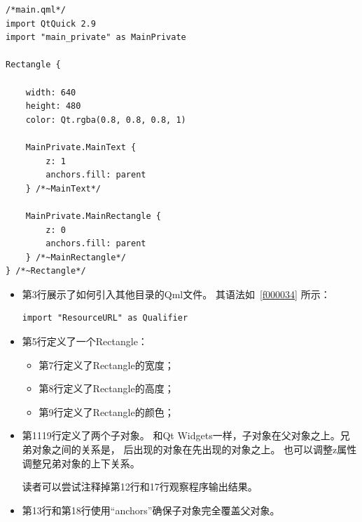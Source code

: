 \FloatBarrier
\begin{lstlisting}[label=f000031,
caption=GoodLuck,
title=\lstlistingname\ \thelstlisting\marginnote{\fbox{\footnotesize{\lstlistingname\ \thelstlisting}}}
]
/*main.qml*/
import QtQuick 2.9
import "main_private" as MainPrivate

Rectangle {

    width: 640
    height: 480
    color: Qt.rgba(0.8, 0.8, 0.8, 1)

    MainPrivate.MainText {
        z: 1
        anchors.fill: parent
    } /*~MainText*/

    MainPrivate.MainRectangle {
        z: 0
        anchors.fill: parent
    } /*~MainRectangle*/
} /*~Rectangle*/
\end{lstlisting}          %

\begin{itemize}

\item 第3行展示了如何引入其他目录的Qml文件。
其语法如\lstlistingname\ \ref{f000034}
所示：

\FloatBarrier
\begin{lstlisting}[label=f000034,
caption=GoodLuck,
title=\lstlistingname\ \thelstlisting\marginnote{\fbox{\footnotesize{\lstlistingname\ \thelstlisting}}}
]
import "ResourceURL" as Qualifier
\end{lstlisting}          %

\item 第5行定义了一个Rectangle：


\begin{itemize}
\item 第7行定义了Rectangle的宽度；
\item 第8行定义了Rectangle的高度；
\item 第9行定义了Rectangle的颜色；
\end{itemize}

\item 第11\raisebox{0.16ex}{\sourcefonttwo\~{}}19行定义了两个子对象。
和Qt Widgets一样，子对象在父对象之上。兄弟对象之间的关系是，
后出现的对象在先出现的对象之上。
也可以调整z属性调整兄弟对象的上下关系。

读者可以尝试注释掉第12行和17行观察程序输出结果。


\item 第13行和第18行使用“anchors”确保子对象完全覆盖父对象。

\end{itemize}

